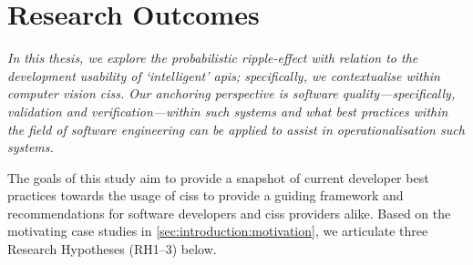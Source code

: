 \section{Research Outcomes}
\label{sec:introduction:hypohtesis}

\itshape
In this thesis, we explore the probabilistic ripple-effect with relation to the development usability of `intelligent' \glspl{api}; specifically, we contextualise within computer vision \glspl{cis}. Our anchoring perspective is software quality---specifically, validation and verification---within such systems and what best practices within the field of software engineering can be applied to assist in operationalisation such systems.
\upshape

The goals of this study aim to provide a snapshot of current developer best practices towards the usage of \glspl{cis} to provide a guiding framework and recommendations for software developers and \glspl{cis} providers alike. Based on the motivating case studies in \cref{sec:introduction:motivation}, we articulate three Research Hypotheses (RH1--3) below.

